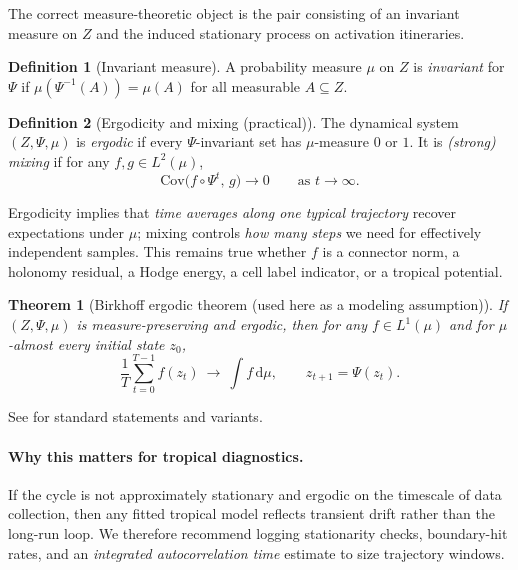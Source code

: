 \documentclass[11pt]{article}
\theoremstyle{definition}
\newtheorem{definition}{Definition}[section]
\theoremstyle{plain}
\newtheorem{theorem}{Theorem}[section]
\theoremstyle{remark}
\begin{document}
The correct measure-theoretic object is the pair consisting of an invariant measure on $Z$ and the induced stationary process on activation itineraries.

\begin{definition}[Invariant measure]
A probability measure $\mu$ on $Z$ is \emph{invariant} for $\Psi$ if $\mu(\Psi^{-1}(A))=\mu(A)$ for all measurable $A\subseteq Z$.
\end{definition}

\begin{definition}[Ergodicity and mixing (practical)]
The dynamical system $(Z,\Psi,\mu)$ is \emph{ergodic} if every $\Psi$-invariant set has $\mu$-measure $0$ or $1$.
It is \emph{(strong) mixing} if for any $f,g\in L^2(\mu)$,
\[
\mathrm{Cov}\bigl(f\circ \Psi^t,\, g\bigr)\to 0
\qquad\text{as }t\to\infty.
\]
\end{definition}

Ergodicity implies that \emph{time averages along one typical trajectory} recover expectations under $\mu$; mixing controls \emph{how many steps} we need for effectively independent samples.
This remains true whether $f$ is a connector norm, a holonomy residual, a Hodge energy, a cell label indicator, or a tropical potential.

\begin{theorem}[Birkhoff ergodic theorem (used here as a modeling assumption)]
If $(Z,\Psi,\mu)$ is measure-preserving and ergodic, then for any $f\in L^1(\mu)$ and for $\mu$-almost every initial state $z_0$,
\[
\frac{1}{T}\sum_{t=0}^{T-1} f(z_t)\ \longrightarrow\ \int f\,\mathrm{d}\mu,
\qquad z_{t+1}=\Psi(z_t).
\]
\end{theorem}

See \cite{WaltersErgodic} for standard statements and variants.

\paragraph{Why this matters for tropical diagnostics.}
If the cycle is not approximately stationary and ergodic on the timescale of data collection, then any fitted tropical model reflects transient drift rather than the long-run loop.
We therefore recommend logging stationarity checks, boundary-hit rates, and an \emph{integrated autocorrelation time} estimate to size trajectory windows.
\end{document}
